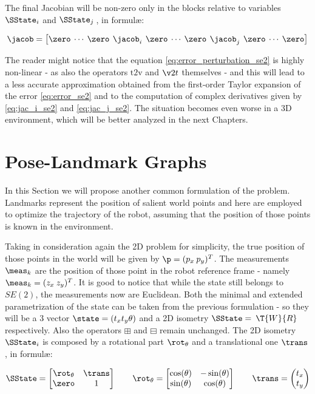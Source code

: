 \noindent The final Jacobian will be non-zero only in the blocks relative to variables $\SState_i$ and $\SState_j\,$, in formul\ae:

\begin{equation}
    \jacob = \left[\zero \: \cdots \: \zero \:\, \jacob_i \,\: \zero \: \cdots \: \zero \:\, \jacob_j \,\: \zero \: \cdots \: \zero\right]
    \label{eq:jac_se2}
\end{equation}

The reader might notice that the equation \ref{eq:error_perturbation_se2} is highly non-linear - as also the operators $\text{t2v}$ and $\v2t$ themselves - and this will lead to a less accurate approximation obtained from the first-order Taylor expansion of the error \ref{eq:error_se2} and to the computation of complex derivatives given by \ref{eq:jac_i_se2} and \ref{eq:jac_j_se2}. The situation becomes even worse in a 3D environment, which will be better analyzed in the next Chapters. 

\section{Pose-Landmark Graphs}\label{sec:pose_land_graph}
In this Section we will propose another common formulation of the problem. Landmarks represent the position of salient world points and here are employed to optimize the trajectory of the robot, assuming that the position of those points is known in the environment. 

Taking in consideration again the 2D problem for simplicity, the true position of those points in the world will be given by $\p = (p_x\: p_y)^T$. The measurements $\meas_k$ are the position of those point in the robot reference frame - namely $\meas_k = (z_x\:z_y)^T$. It is good to notice that while the state still belongs to $SE(2)$, the measurements now are Euclidean. Both the minimal and extended parametrization of the state can be taken from the previous formulation - so they will be a $3$ vector $\state = (t_x t_y \theta)$ and a 2D isometry $\SState =\: \T{W}{R}$ respectively. Also the operators $\boxplus$ and $\boxminus$ remain unchanged. The 2D isometry $\SState_i$ is composed by a rotational part $\rot_{\theta}$ and a translational one $\trans$, in formul\ae:

\begin{align}
    \SState = 
        \begin{bmatrix}
            \rot_{\theta} & \trans \\
            \zero & 1
        \end{bmatrix} 
    \qquad
    \rot_{\theta} = 
        \begin{bmatrix}
            \cos(\theta) & -\sin(\theta) \\
            \sin(\theta) & \cos(\theta)
        \end{bmatrix}
    \qquad
    \trans = 
        \begin{pmatrix}
            t_x \\
            t_y
        \end{pmatrix}
    \label{eq:2d_isometry}
\end{align}

